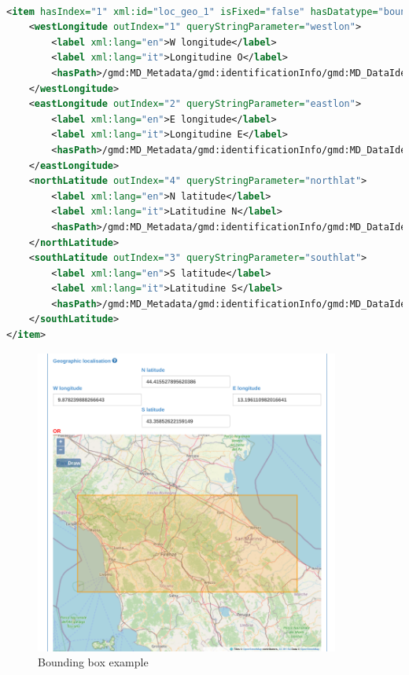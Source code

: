 \documentclass[10pt]{article}
\begin{document}
\begin{lstlisting}[language=xml]
	
<item hasIndex="1" xml:id="loc_geo_1" isFixed="false" hasDatatype="boundingBox">
	<westLongitude outIndex="1" queryStringParameter="westlon">
		<label xml:lang="en">W longitude</label>
		<label xml:lang="it">Longitudine O</label>
		<hasPath>/gmd:MD_Metadata/gmd:identificationInfo/gmd:MD_DataIdentification/gmd:extent/gmd:EX_Extent/gmd:geographicElement/gmd:EX_GeographicBoundingBox/gmd:westBoundLongitude/gco:Decimal</hasPath>
	</westLongitude>
	<eastLongitude outIndex="2" queryStringParameter="eastlon">
		<label xml:lang="en">E longitude</label>
		<label xml:lang="it">Longitudine E</label>
		<hasPath>/gmd:MD_Metadata/gmd:identificationInfo/gmd:MD_DataIdentification/gmd:extent/gmd:EX_Extent/gmd:geographicElement/gmd:EX_GeographicBoundingBox/gmd:eastBoundLongitude/gco:Decimal</hasPath>
	</eastLongitude>
	<northLatitude outIndex="4" queryStringParameter="northlat">
		<label xml:lang="en">N latitude</label>
		<label xml:lang="it">Latitudine N</label>
		<hasPath>/gmd:MD_Metadata/gmd:identificationInfo/gmd:MD_DataIdentification/gmd:extent/gmd:EX_Extent/gmd:geographicElement/gmd:EX_GeographicBoundingBox/gmd:northBoundLatitude/gco:Decimal</hasPath>
	</northLatitude>
	<southLatitude outIndex="3" queryStringParameter="southlat">
		<label xml:lang="en">S latitude</label>
		<label xml:lang="it">Latitudine S</label>
		<hasPath>/gmd:MD_Metadata/gmd:identificationInfo/gmd:MD_DataIdentification/gmd:extent/gmd:EX_Extent/gmd:geographicElement/gmd:EX_GeographicBoundingBox/gmd:southBoundLatitude/gco:Decimal</hasPath>
	</southLatitude>
</item>	
\end{lstlisting}

\begin{figure}[h]
	\caption{Bounding box example}
	\includegraphics[width=10cm]{BoundingBox.png}
	\centering
\end{figure}	
\end{document}
